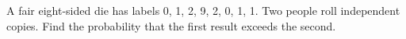 A fair eight-sided die has labels 0, 1, 2, 9, 2, 0, 1, 1. Two people roll independent copies. Find the probability that the first result exceeds the second.
